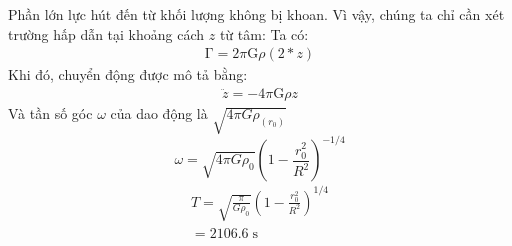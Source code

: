 \begin{solution}

Phần lớn lực hút đến từ khối lượng không bị khoan. Vì vậy, chúng ta chỉ cần xét trường hấp dẫn tại khoảng cách $z$ từ tâm:
Ta có:
\begin{gather*}
 \mathrm{\Gamma} = 2 \pi \mathrm{G} \rho (2 * z) 
\end{gather*}
Khi đó, chuyển động được mô tả bằng:
\begin{gather*}
    \ddot{z} = -4 \pi \mathrm{G} \rho z 
\end{gather*}
Và tần số góc $\omega$ của dao động là
\(\sqrt{4\pi G\rho_{\left( r_0 \right)}}\)
\begin{equation}
    \omega = \sqrt{4\pi G \rho_0} {\left(1 - \frac{r_0^2}{R^2} 
    \right)} ^ {-1 / 4} 
    \label{densityDistribution}
\end{equation}
\begin{gather}
    T= \sqrt{\frac{\pi} {G \rho_0}} {\left(1 - \frac{r_0^2}{R^2} 
    \right)} ^ {1 / 4} \\
    = 2106.6 \;\mathrm{s}
\end{gather}
\end{solution}